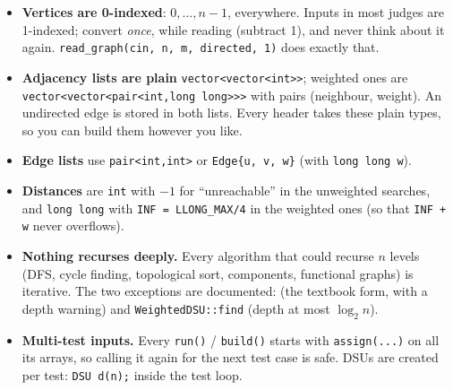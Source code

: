 \begin{itemize}[leftmargin=*]
    \item \textbf{Vertices are 0-indexed}: $0,\dots,n-1$, everywhere. Inputs in most judges are 1-indexed; convert \emph{once}, while reading (subtract 1), and never think about it again. \texttt{read\_graph(cin, n, m, directed, 1)} does exactly that.
    \item \textbf{Adjacency lists are plain} \texttt{vector<vector<int>>}; weighted ones are \texttt{vector<vector<pair<int,long long>>>} with pairs (neighbour, weight). An undirected edge is stored in both lists. Every header takes these plain types, so you can build them however you like.
    \item \textbf{Edge lists} use \texttt{pair<int,int>} or \texttt{Edge\{u, v, w\}} (with \texttt{long long w}).
    \item \textbf{Distances} are \texttt{int} with $-1$ for ``unreachable'' in the unweighted searches, and \texttt{long long} with \texttt{INF = LLONG\_MAX/4} in the weighted ones (so that \texttt{INF + w} never overflows).
    \item \textbf{Nothing recurses deeply.} Every algorithm that could recurse $n$ levels (DFS, cycle finding, topological sort, components, functional graphs) is iterative. The two exceptions are documented:  (the textbook form, with a depth warning) and \texttt{WeightedDSU::find} (depth at most $\log_2 n$).
    \item \textbf{Multi-test inputs.} Every \texttt{run()} / \texttt{build()} starts with \texttt{assign(...)} on all its arrays, so calling it again for the next test case is safe. DSUs are created per test: \texttt{DSU d(n);} inside the test loop.
\end{itemize}

\begin{diagrambox}
\end{diagrambox}

